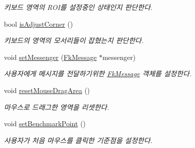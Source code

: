 \begin{DoxyCompactItemize}
\begin{DoxyCompactList}\small\item\em 키보드 영역의 R\+O\+I를 설정중인 상태인지 판단한다. \end{DoxyCompactList}\item 
\hypertarget{class_fk_mouse_listener_a74cad4b0b3624b0e8414f066c0e86228}{}bool \hyperlink{class_fk_mouse_listener_a74cad4b0b3624b0e8414f066c0e86228}{is\+Adjust\+Corner} ()\label{class_fk_mouse_listener_a74cad4b0b3624b0e8414f066c0e86228}

\begin{DoxyCompactList}\small\item\em 키보드의 영역의 모서리들이 잡혔는지 판단한다. \end{DoxyCompactList}\item 
\hypertarget{class_fk_mouse_listener_ab56fe8c5f1d630dd5bb889002ebeb1a8}{}void \hyperlink{class_fk_mouse_listener_ab56fe8c5f1d630dd5bb889002ebeb1a8}{set\+Messenger} (\hyperlink{class_fk_message}{Fk\+Message} $\ast$messenger)\label{class_fk_mouse_listener_ab56fe8c5f1d630dd5bb889002ebeb1a8}

\begin{DoxyCompactList}\small\item\em 사용자에게 메시지를 전달하기위한 \hyperlink{class_fk_message}{Fk\+Message} 객체를 설정한다. \end{DoxyCompactList}\item 
\hypertarget{class_fk_mouse_listener_a8aa30e4c9b08d9cb00d804d5a732834f}{}void \hyperlink{class_fk_mouse_listener_a8aa30e4c9b08d9cb00d804d5a732834f}{reset\+Mouse\+Drag\+Area} ()\label{class_fk_mouse_listener_a8aa30e4c9b08d9cb00d804d5a732834f}

\begin{DoxyCompactList}\small\item\em 마우스로 드래그한 영역을 리셋한다. \end{DoxyCompactList}\item 
\hypertarget{class_fk_mouse_listener_af557b34d474c416164e4eab211f16c96}{}void \hyperlink{class_fk_mouse_listener_af557b34d474c416164e4eab211f16c96}{set\+Benchmark\+Point} ()\label{class_fk_mouse_listener_af557b34d474c416164e4eab211f16c96}

\begin{DoxyCompactList}\small\item\em 사용자가 처음 마우스를 클릭한 기준점을 설정한다. \end{DoxyCompactList}\end{DoxyCompactItemize}
